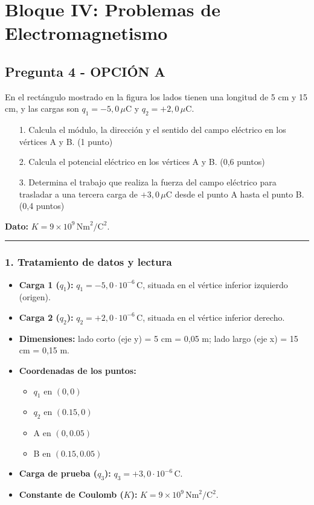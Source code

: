\section{Bloque IV: Problemas de Electromagnetismo}
\label{sec:em_2003_jun_ord}

\subsection{Pregunta 4 - OPCIÓN A}
\label{subsec:4A_2003_jun_ord}

\begin{cajaenunciado}
En el rectángulo mostrado en la figura los lados tienen una longitud de 5 cm y 15 cm, y las cargas son $q_1 = -5,0\,\mu\text{C}$ y $q_2 = +2,0\,\mu\text{C}$.
\begin{enumerate}
    \item[1.] Calcula el módulo, la dirección y el sentido del campo eléctrico en los vértices A y B. (1 punto)
    \item[2.] Calcula el potencial eléctrico en los vértices A y B. (0,6 puntos)
    \item[3.] Determina el trabajo que realiza la fuerza del campo eléctrico para trasladar a una tercera carga de $+3,0\,\mu\text{C}$ desde el punto A hasta el punto B. (0,4 puntos)
\end{enumerate}
\textbf{Dato:} $K=9\times10^9\,\text{Nm}^2/\text{C}^2$.
\end{cajaenunciado}
\hrule

\subsubsection*{1. Tratamiento de datos y lectura}
\begin{itemize}
    \item \textbf{Carga 1 ($q_1$):} $q_1 = -5,0 \cdot 10^{-6} \, \text{C}$, situada en el vértice inferior izquierdo (origen).
    \item \textbf{Carga 2 ($q_2$):} $q_2 = +2,0 \cdot 10^{-6} \, \text{C}$, situada en el vértice inferior derecho.
    \item \textbf{Dimensiones:} lado corto (eje y) = 5 cm = 0,05 m; lado largo (eje x) = 15 cm = 0,15 m.
    \item \textbf{Coordenadas de los puntos:}
        \begin{itemize}
            \item $q_1$ en $(0, 0)$
            \item $q_2$ en $(0.15, 0)$
            \item A en $(0, 0.05)$
            \item B en $(0.15, 0.05)$
        \end{itemize}
    \item \textbf{Carga de prueba ($q_3$):} $q_3 = +3,0 \cdot 10^{-6} \, \text{C}$.
    \item \textbf{Constante de Coulomb ($K$):} $K=9\times10^9\,\text{Nm}^2/\text{C}^2$.
\end{itemize}

